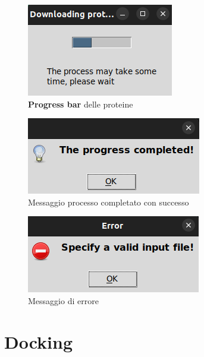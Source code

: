 \begin{figure}[H]
    \centering
    \includegraphics{immagini/proteinsProgressBar.png}
    \caption{\textbf{Progress bar} delle proteine}
    \label{fig:protein progress bar}
\end{figure}

\begin{figure}[H]
    \centering
    \includegraphics{immagini/progressCompletedReceptors.png}
    \caption{Messaggio processo completato con successo}
    \label{fig:progress completed proteins}
\end{figure}

\begin{figure}[H]
    \centering
    \includegraphics{immagini/invalidInputReceptors.png}
    \caption{Messaggio di errore}
    \label{fig:Invalid input proteins}
\end{figure}

\section{Docking}

